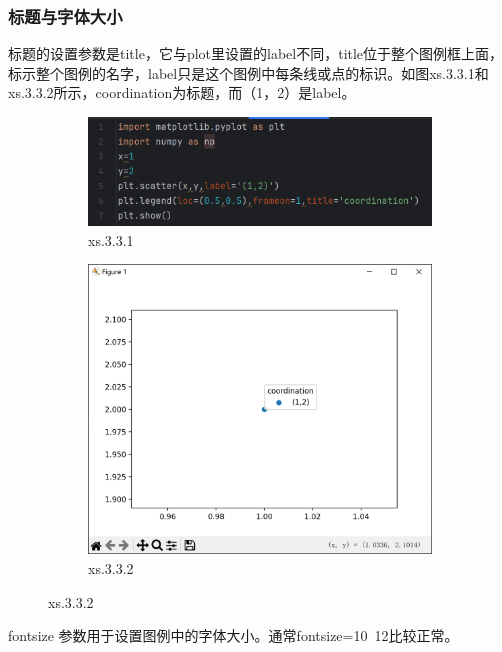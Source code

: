 \documentclass[12pt]{article}
\begin{document}
\subsubsection{标题与字体大小}
标题的设置参数是title，它与plot里设置的label不同，title位于整个图例框上面，标示整个图例的名字，label只是这个图例中每条线或点的标识。如图xs.3.3.1和xs.3.3.2所示，coordination为标题，而（1，2）是label。
\begin{figure}[H]
    \centering
    \begin{subfigure}[b]{0.55\textwidth}
        \includegraphics[width=\textwidth]{图例 program2.png} %
        \caption{xs.3.3.1}
        \label{fig:line-graph2}
    \end{subfigure}
    \hfill
    \begin{subfigure}[b]{0.4\textwidth}
        \includegraphics[width=\textwidth]{图例 Pic2.png} %
        \caption{xs.3.3.2}
        \label{fig:line-graph2-pic2}
    \end{subfigure}
\end{figure}
fontsize 参数用于设置图例中的字体大小。通常fontsize=10~12比较正常。
\end{document}
